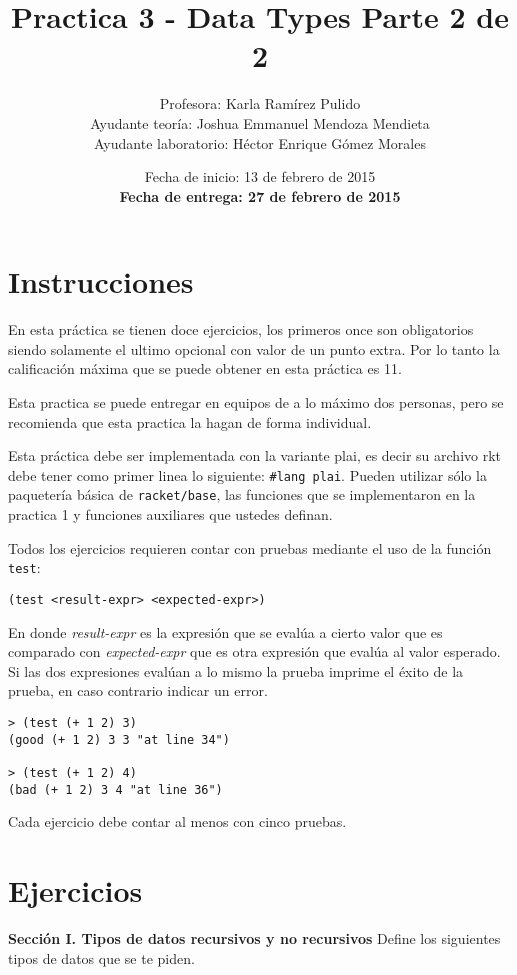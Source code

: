 \documentclass{article}
\author{Profesora: Karla Ramírez Pulido\\
  Ayudante teoría: Joshua Emmanuel Mendoza Mendieta\\
  Ayudante laboratorio: Héctor Enrique Gómez Morales}
\title{Practica 3 - Data Types Parte 2 de 2}
\date{Fecha de inicio: 13 de febrero de 2015\\
  \textbf{Fecha de entrega: 27 de febrero de 2015}}
\begin{document}
\maketitle
\section{Instrucciones}
En esta práctica se tienen doce ejercicios, los primeros once son
obligatorios siendo solamente el ultimo opcional con valor de un
punto extra. Por lo tanto la calificación máxima que se puede obtener en
esta práctica es 11.

Esta practica se puede entregar en equipos de a lo máximo dos
personas, pero se recomienda que esta practica la hagan de forma
individual.

Esta práctica debe ser implementada con la variante plai, es decir
su archivo rkt debe tener como primer linea lo siguiente:
\texttt{\#lang plai}. Pueden utilizar sólo la paquetería básica de
\texttt{racket/base}, las funciones que se implementaron en la
practica 1 y funciones auxiliares que ustedes definan.

Todos los ejercicios requieren contar con pruebas mediante el uso de
la función \texttt{test}:
\begin{verbatim}
(test <result-expr> <expected-expr>)
\end{verbatim}

En donde \textit{result-expr} es la expresión que se evalúa a cierto
valor que es comparado con \textit{expected-expr} que es otra
expresión que evalúa al valor esperado. Si las dos expresiones evalúan
a lo mismo la prueba imprime el éxito de la prueba, en caso contrario
indicar un error.

\begin{verbatim}
> (test (+ 1 2) 3)
(good (+ 1 2) 3 3 "at line 34")

> (test (+ 1 2) 4)
(bad (+ 1 2) 3 4 "at line 36")
\end{verbatim}

Cada ejercicio debe contar al menos con cinco pruebas.

\section{Ejercicios}
\textbf{Sección I. Tipos de datos recursivos y no recursivos} Define
los siguientes tipos de datos que se te piden.
\end{document}
